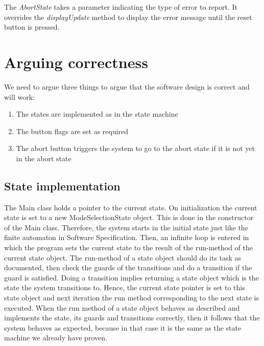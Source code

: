 \documentclass[a4paper,oneside,11pt]{article}
\begin{document}
The \emph{AbortState} takes a parameter indicating the type of error to report. It overrides the \emph{displayUpdate} method to display the error message until the reset button is pressed.

\section{Arguing correctness}
We need to argue three things to argue that the software design is correct and will work:
\begin{enumerate}
\item The states are implemented as in the state machine
\item The button flags are set as required
\item The abort button triggers the system to go to the abort state if it is not yet in the abort state
\end{enumerate}

\subsection{State implementation}
The Main class holds a pointer to the current state. On initialization the current state is set to a new ModeSelectionState object. This is done in the constructor of the Main class. Therefore, the system starts in the initial state just like the finite automaton in Software Specification. Then, an infinite loop is entered in which the program sets the current state to the result of the run-method of the current state object. The run-method of a state object should do its task as documented, then check the guards of the transitions and do a transition if the guard is satisfied. Doing a transition implies returning a state object which is the state the system transitions to. Hence, the current state pointer is set to this state object and next iteration the run method corresponding to the next state is executed. When the run method of a state object behaves as described and implements the state, its guards and transitions correctly, then it follows that the system behaves as expected, because in that case it is the same as the state machine we already have proven.
\end{document}
